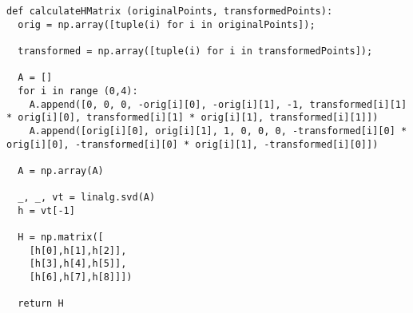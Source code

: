 \begin{lstlisting}[caption=Metoda u Pythonu za izračunavanje transformacijske matrice, label=code:pythonCalculateMatrix]
def calculateHMatrix (originalPoints, transformedPoints):  
  orig = np.array([tuple(i) for i in originalPoints]);
  
  transformed = np.array([tuple(i) for i in transformedPoints]);

  A = []
  for i in range (0,4):
    A.append([0, 0, 0, -orig[i][0], -orig[i][1], -1, transformed[i][1] * orig[i][0], transformed[i][1] * orig[i][1], transformed[i][1]])
    A.append([orig[i][0], orig[i][1], 1, 0, 0, 0, -transformed[i][0] * orig[i][0], -transformed[i][0] * orig[i][1], -transformed[i][0]])

  A = np.array(A)

  _, _, vt = linalg.svd(A)
  h = vt[-1]
  
  H = np.matrix([
    [h[0],h[1],h[2]],
    [h[3],h[4],h[5]],
    [h[6],h[7],h[8]]])

  return H
\end{lstlisting}
